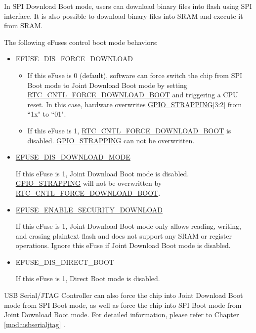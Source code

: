 \documentclass[main\_\_EN.tex]{subfiles}
\begin{document}
In SPI Download Boot mode, users can download binary files into flash using SPI interface. It is also possible to download binary files into SRAM and execute it from SRAM.

The following eFuses control boot mode behaviors:

\begin{itemize}
    \item \hyperref[fielddesc:EFUSEDISFORCEDOWNLOAD]{EFUSE\_DIS\_FORCE\_DOWNLOAD}
    \begin{itemize}
    \item If this eFuse is 0 (default), software can force switch the chip from SPI Boot mode to Joint Download Boot mode by setting \hyperref[fielddesc:RTCCNTLFORCEDOWNLOADBOOT]{RTC\_CNTL\_FORCE\_DOWNLOAD\_BOOT} and triggering a CPU reset. In this case, hardware overwrites \hyperref[fielddesc:GPIOSTRAPPING]{GPIO\_STRAPPING}[3:2] from ``1x" to ``01".
    \item If this eFuse is 1, \hyperref[fielddesc:RTCCNTLFORCEDOWNLOADBOOT]{RTC\_CNTL\_FORCE\_DOWNLOAD\_BOOT} is disabled. \hyperref[fielddesc:GPIOSTRAPPING]{GPIO\_STRAPPING} can not be overwritten.
    \end{itemize}
    \item \hyperref[fielddesc:EFUSEDISDOWNLOADMODE]{EFUSE\_DIS\_DOWNLOAD\_MODE}

    If this eFuse is 1, Joint Download Boot mode is disabled. \hyperref[fielddesc:GPIOSTRAPPING]{GPIO\_STRAPPING} will not be overwritten by \hyperref[fielddesc:RTCCNTLFORCEDOWNLOADBOOT]{RTC\_CNTL\_FORCE\_DOWNLOAD\_BOOT}.

    \item \hyperref[fielddesc:EFUSEENABLESECURITYDOWNLOAD]{EFUSE\_ENABLE\_SECURITY\_DOWNLOAD}

    If this eFuse is 1, Joint Download Boot mode only allows reading, writing, and erasing plaintext flash and does not support any SRAM or register operations. Ignore this eFuse if Joint Download Boot mode is disabled.

    \item EFUSE\_DIS\_DIRECT\_BOOT

    If this eFuse is 1, Direct Boot mode is disabled.
\end{itemize}

USB Serial/JTAG Controller can also force the chip into Joint Download Boot mode from SPI Boot mode, as well as force the chip into SPI Boot mode from Joint Download Boot mode. For detailed information, please refer to Chapter \ref{mod:usbserialjtag} \textit{}.
\end{document}
